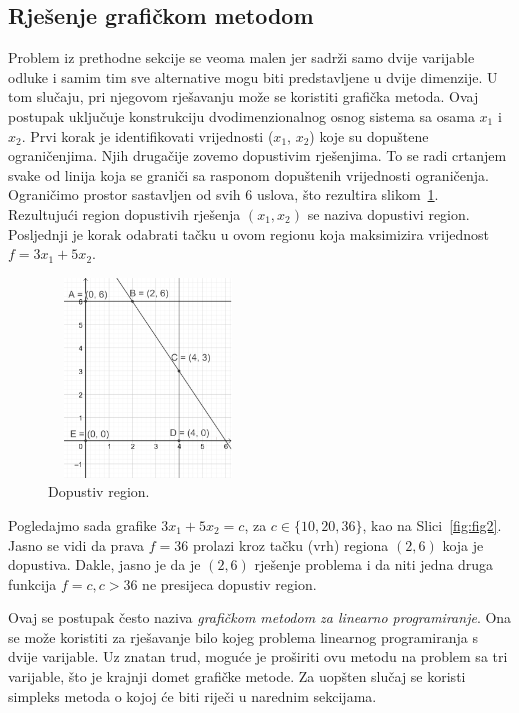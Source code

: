 \documentclass[a4paper, utf8, 11pt, colorlinks]{article}
\begin{document}
\subsection{Rješenje grafičkom metodom}
 Problem iz prethodne sekcije se veoma malen jer sadrži samo dvije varijable odluke i samim tim sve alternative mogu biti predstavljene u dvije dimenzije. U tom slučaju, pri njegovom rješavanju može se koristiti grafička metoda. Ovaj postupak uključuje konstrukciju dvodimenzionalnog osnog sistema sa osama $x_1$ i $x_2$.  Prvi korak je identifikovati vrijednosti ($x_1$, $x_2$) koje su dopuštene ograničenjima. Njih drugačije zovemo dopustivim rješenjima. To se radi crtanjem svake od 
linija koja se graniči sa rasponom dopuštenih vrijednosti ograničenja. Ograničimo prostor sastavljen od svih 6 uslova, što rezultira slikom~\ref{fig:fig1}.  Rezultujući region dopustivih rješenja $(x_1, x_2)$ se naziva dopustivi region. Posljednji je korak odabrati tačku u ovom regionu  koja maksimizira vrijednost $f = 3x_1 + 5x_2$. 

\begin{figure}
    \centering
    \includegraphics[width=150pt,height=150pt]{fig1.eps}
    \caption{Dopustiv region.}
    \label{fig:fig1}
\end{figure}
Pogledajmo sada grafike $3x_1 + 5 x_2 = c$, za $c \in \{10,20, 36\}$, kao na Slici~\ref{fig:fig2}. Jasno se vidi da prava $f = 36$ prolazi kroz tačku (vrh) regiona $(2,6)$ koja je dopustiva. Dakle, jasno je da je $(2, 6)$ rješenje problema i da niti jedna druga funkcija $f=c, c > 36$ ne presijeca dopustiv region. 

Ovaj se postupak često naziva \emph{grafičkom metodom za linearno programiranje}. Ona se može koristiti za rješavanje bilo kojeg problema linearnog programiranja s dvije varijable. Uz znatan trud, moguće je proširiti ovu metodu na problem sa tri varijable, što je krajnji domet grafičke metode. Za uopšten slučaj se koristi  simpleks metoda o kojoj će biti riječi u narednim sekcijama.
\end{document}
